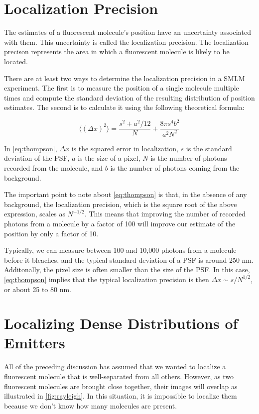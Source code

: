 \documentclass[10pt,a4paper,oneside]{book}
\begin{document}
\section{Localization Precision}

The estimates of a fluorescent molecule's position have an uncertainty associated with them. This uncertainty is called the localization precision. The localization precison represents the area in which a fluorescent molecule is likely to be located.

There are at least two ways to determine the localization precision in a SMLM experiment. The first is to measure the position of a single molecule multiple times and compute the standard deviation of the resulting distribution of position estimates. The second is to calculate it using the following theoretical formula\cite{thompson-biophysicaljournal-2002}:

\begin{equation}
    \langle \left( \Delta x \right)^2 \rangle = \frac{s^2 + a^{2}/12}{N} + \frac{8 \pi s^4 b^2}{a^2 N^2}
    \label{eq:thompson}
\end{equation}

\noindent In \autoref{eq:thompson}, $\Delta x$ is the squared error in localization, $s$ is the standard deviation of the PSF, $a$ is the size of a pixel, $N$ is the number of photons recorded from the molecule, and $b$ is the number of photons coming from the background. 

The important point to note about \autoref{eq:thompson} is that, in the absence of any background, the localization precision, which is the square root of the above expression, scales as $N^{-1/2}$. This means that improving the number of recorded photons from a molecule by a factor of 100 will improve our estimate of the position by only a factor of 10.

Typically, we can measure between 100 and 10,000 photons from a molecule before it bleaches, and the typical standard deviation of a PSF is around 250 nm. Additonally, the pixel size is often smaller than the size of the PSF. In this case, \ref{eq:thompson} implies that the typical localization precision is then $\Delta x \sim s / N^{1/2}$, or about 25 to 80 nm.

\section{Localizing Dense Distributions of Emitters}

All of the preceding discussion has assumed that we wanted to localize a fluorescent molecule that is well-separated from all others. However, as two fluorescent molecules are brought close together, their images will overlap as illustrated in \autoref{fig:rayleigh}. In this situation, it is impossible to localize them because we don't know how many molecules are present.
\end{document}

